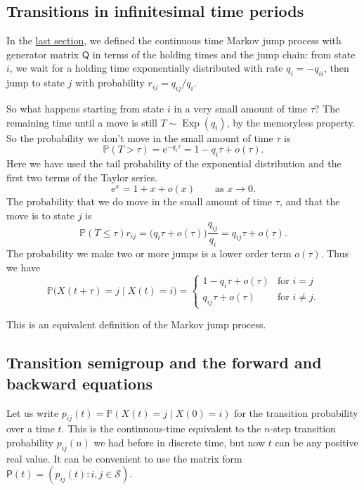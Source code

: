 \documentclass[
  a4paper,
]{article}
\theoremstyle{definition}
\theoremstyle{definition}
\theoremstyle{definition}
\theoremstyle{remark}
\begin{document}
\hypertarget{jump-infinitesimal}{%
\subsection{Transitions in infinitesimal time periods}\label{jump-infinitesimal}}

In the \protect\hyperlink{S17-continuous-time}{last section}, we defined the continuous time Markov jump process with generator matrix \(\mathsf Q\) in terms of the holding times and the jump chain: from state \(i\), we wait for a holding time exponentially distributed with rate \(q_i = -q_{ii}\), then jump to state \(j\) with probability \(r_{ij} = q_{ij}/q_i\).

So what happens starting from state \(i\) in a very small amount of time \(\tau\)? The remaining time until a move is still \(T \sim \operatorname{Exp}(q_i)\), by the memoryless property. So the probability we don't move in the small amount of time \(\tau\) is
\[ \mathbb P(T > \tau) = \mathrm{e}^{-q_i \tau} = 1 - q_i\tau + o(\tau) . \]
Here we have used the tail probability of the exponential distribution and the first two terms of the Taylor series.
\[ \mathrm{e}^x = 1 + x + o(x) \qquad \text{as $x \to 0$.} \]
The probability that we do move in the small amount of time \(\tau\), and that the move is to state \(j\) is
\[ \mathbb P(T \leq \tau)r_{ij} = \big(q_i\tau + o(\tau)\big) \frac{q_{ij}}{q_i}  = q_{ij}\tau + o(\tau) . \]
The probability we make two or more jumps is a lower order term \(o(\tau)\). Thus we have
\[ \mathbb P\big(X(t+\tau) = j \mid X(t) = i \big) = \begin{cases}
   1 - q_i\tau + o(\tau) & \text{for } i = j \\
   q_{ij}\tau + o(\tau) & \text{for } i \neq j. \end{cases} \]

This is an equivalent definition of the Markov jump process.

\hypertarget{semigroup}{%
\subsection{Transition semigroup and the forward and backward equations}\label{semigroup}}

Let us write \(p_{ij}(t) = \mathbb P(X(t) = j \mid X(0) = i)\) for the transition probability over a time \(t\). This is the continuous-time equivalent to the \(n\)-step transition probability \(p_{ij}(n)\) we had before in discrete time, but now \(t\) can be any positive real value. It can be convenient to use the matrix form \(\mathsf P(t) = (p_{ij}(t) : i,j \in \mathcal S)\).
\end{document}
